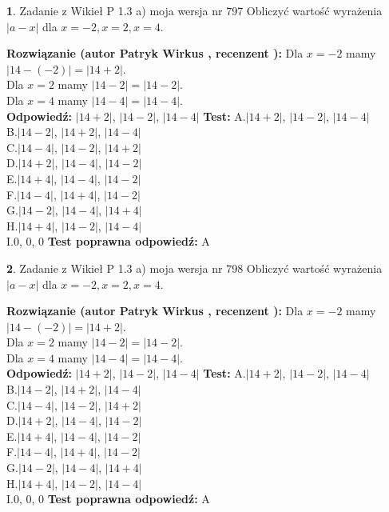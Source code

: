\documentclass[12pt, a4paper]{article}
\theoremstyle{definition} %
\newtheorem{zad}{}
\newcommand{\zadStart}[1]{\begin{zad}#1\newline}
\newcommand{\zadStop}{\end{zad}}
\newcommand{\rozwStart}[2]{\noindent \textbf{Rozwiązanie (autor #1 , recenzent #2): }\newline}
\newcommand{\rozwStop}{\newline}
\newcommand{\odpStart}{\noindent \textbf{Odpowiedź:}\newline}
\newcommand{\odpStop}{\newline}
\newcommand{\testStart}{\noindent \textbf{Test:}\newline}
\newcommand{\testStop}{\newline}
\newcommand{\kluczStart}{\noindent \textbf{Test poprawna odpowiedź:}\newline}
\newcommand{\kluczStop}{\newline}
\begin{document}
\zadStart{Zadanie z Wikieł P 1.3 a) moja wersja nr 797}
Obliczyć wartość wyrażenia $|a - x|$ dla $x=-2,x=2,x=4$.
\zadStop
\rozwStart{Patryk Wirkus}{}
Dla $x = -2$ mamy $|14 - (-2)| = |14 + 2|$.\\
Dla $x = 2$ mamy $|14 - 2| = |14 - 2|$.\\
Dla $x = 4$ mamy $|14 - 4| = |14 - 4|$.\\
\rozwStop
\odpStart
$|14 + 2|$, $|14 - 2|$, $|14 - 4|$
\odpStop
\testStart
A.$|14 + 2|$, $|14 - 2|$, $|14 - 4|$\\
B.$|14 - 2|$, $|14 + 2|$, $|14 - 4|$\\
C.$|14 - 4|$, $|14 - 2|$, $|14 + 2|$\\
D.$|14 + 2|$, $|14 - 4|$, $|14 - 2|$\\
E.$|14 + 4|$, $|14 - 4|$, $|14 - 2|$\\
F.$|14 - 4|$, $|14 + 4|$, $|14 - 2|$\\
G.$|14 - 2|$, $|14 - 4|$, $|14 + 4|$\\
H.$|14 + 4|$, $|14 - 2|$, $|14 - 4|$\\
I.$0$, $0$, $0$
\testStop
\kluczStart
A
\kluczStop



\zadStart{Zadanie z Wikieł P 1.3 a) moja wersja nr 798}
Obliczyć wartość wyrażenia $|a - x|$ dla $x=-2,x=2,x=4$.
\zadStop
\rozwStart{Patryk Wirkus}{}
Dla $x = -2$ mamy $|14 - (-2)| = |14 + 2|$.\\
Dla $x = 2$ mamy $|14 - 2| = |14 - 2|$.\\
Dla $x = 4$ mamy $|14 - 4| = |14 - 4|$.\\
\rozwStop
\odpStart
$|14 + 2|$, $|14 - 2|$, $|14 - 4|$
\odpStop
\testStart
A.$|14 + 2|$, $|14 - 2|$, $|14 - 4|$\\
B.$|14 - 2|$, $|14 + 2|$, $|14 - 4|$\\
C.$|14 - 4|$, $|14 - 2|$, $|14 + 2|$\\
D.$|14 + 2|$, $|14 - 4|$, $|14 - 2|$\\
E.$|14 + 4|$, $|14 - 4|$, $|14 - 2|$\\
F.$|14 - 4|$, $|14 + 4|$, $|14 - 2|$\\
G.$|14 - 2|$, $|14 - 4|$, $|14 + 4|$\\
H.$|14 + 4|$, $|14 - 2|$, $|14 - 4|$\\
I.$0$, $0$, $0$
\testStop
\kluczStart
A
\kluczStop
\end{document}
